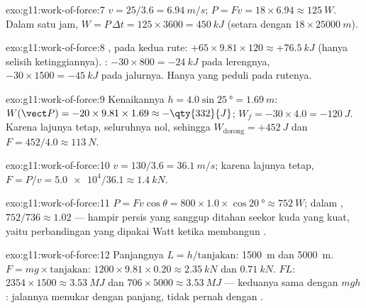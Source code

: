 \begin{solution}{exo:g11:work-of-force:7}
$v = 25/3.6 = \qty{6.94}{m/s}$; $P = Fv = 18 \times 6.94 \approx
\qty{125}{W}$. Dalam satu jam, $W = P\,\Delta t = 125 \times 3600 =
\qty{450}{kJ}$ (setara dengan $18 \times \qty{25000}{m}$).
\end{solution}

\begin{solution}{exo:g11:work-of-force:8}
, pada kedua rute: $+65 \times 9.81 \times 120 \approx
+\qty{76.5}{kJ}$ (hanya selisih ketinggiannya). :
$-30 \times 800 =
-\qty{24}{kJ}$ pada lerengnya,
$-30 \times 1500 = -\qty{45}{kJ}$ pada jalurnya. Hanya  yang
peduli pada rutenya.
\end{solution}

\begin{solution}{exo:g11:work-of-force:9}
Kenaikannya $h = 4.0\sin\qty{25}{\degree} = \qty{1.69}{m}$:
$W(\vect P) = -20 \times 9.81 \times 1.69 \approx -\qty{332}{J}$;
$W_f = -30 \times 4.0 = -\qty{120}{J}$. Karena lajunya tetap, 
seluruhnya nol, sehingga $W_{\text{dorong}} = +\qty{452}{J}$ dan
$F = 452/4.0 \approx \qty{113}{N}$.
\end{solution}

\begin{solution}{exo:g11:work-of-force:10}
$v = 130/3.6 = \qty{36.1}{m/s}$; karena lajunya tetap,
$F = P/v = \num{5.0e4}/36.1 \approx \qty{1.4}{kN}$.
\end{solution}

\begin{solution}{exo:g11:work-of-force:11}
$P = Fv\cos\theta = 800 \times 1.0 \times \cos\qty{20}{\degree}
\approx \qty{752}{W}$; dalam , $752/736 \approx \num{1.02}$
--- hampir persis yang sanggup ditahan seekor kuda yang kuat, yaitu
perbandingan yang dipakai Watt ketika membangun .
\end{solution}

\begin{solution}{exo:g11:work-of-force:12}
Panjangnya $L = h/\text{tanjakan}$: \qty{1500}{m} dan \qty{5000}{m}.
 $F = mg \times \text{tanjakan}$:
$1200 \times 9.81 \times 0.20 \approx
\qty{2.35}{kN}$ dan
$\qty{0.71}{kN}$.  $FL$: $2354 \times 1500
\approx \qty{3.53}{MJ}$ dan $706 \times 5000 \approx \qty{3.53}{MJ}$ ---
keduanya sama dengan $mgh$: jalannya menukar  dengan panjang, tidak
pernah dengan .
\end{solution}

